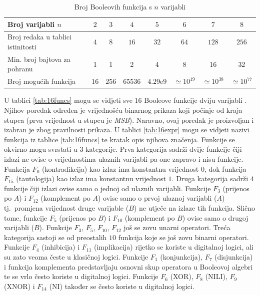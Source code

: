 \documentclass[times, utf8, diplomski]{fer}
\begin{document}
\begin{table}[htb]
	\centering
	\caption{Broj Booleovih funkcija s $n$ varijabli}
	\label{tab:broj-Funkcija}
	\begin{tabular}{|l|c|c|c|c|c|c|c|}
		\hline
		Broj varijabli $n$ & $2$ & $3$ & $4$ & $5$ & $6$ & $7$ & $8$ \\ \hline
		Broj redaka u tablici istinitosti & $4$ & $8$ & $16$ & $32$ & $64$ & $128$ & $256$ \\ \hline
		Min. broj bajtova za pohranu & 1 & 1 & 2 & 4 & 8 & 16 & 32 \\ \hline
		Broj mogućih funkcija & $16$ & $256$ & $65536$ & $4.29\mathrm{e}{9}$ & $\simeq 10^{19}$ & $\simeq 10^{38}$ & $\simeq 10^{77}$ \\ \hline
	\end{tabular}
\end{table}

U tablici \ref{tab:16funcs} mogu se vidjeti sve $16$ Booleove funkcije dviju varijabli \cite{book:digital_design}. Njihov poredak određen je vrijednošću binarnog prikaza koji počinje od kraja stupca (prva vrijednost u stupcu je \textit{MSB}). Naravno, ovaj poredak je proizvoljan i izabran je zbog pravilnosti prikaza. U tablici \ref{tab:16expr} mogu se vidjeti nazivi funkcija iz tablice \ref{tab:16funcs} te kratak opis njihova značenja. Funkcije se okvirno mogu svrstati u $3$ kategorije. Prva kategorija sadrži dvije funkcije čiji izlazi ne ovise o vrijednostima ulaznih varijabli pa one zapravo i nisu funkcije. Funkcija $F_{0}$ (kontradikcija) kao izlaz ima konstantnu vrijednost $0$, dok funkcija $F_{15}$ (tautologija) kao izlaz ima konstantnu vrijednost $1$. Druga kategorija sadrži $4$ funkcije čiji izlazi ovise samo o jednoj od ulaznih varijabli. Funkcije $F_{3}$ (prijenos po $A$) i $F_{12}$ (komplement po $A$) ovise samo o prvoj ulaznoj varijabli ($A$) tj.~promjena vrijednost druge varijable ($B$) ne utječe na izlaze tih funkcija. Slično tome, funkcije $F_{5}$ (prijenos po $B$) i $F_{10}$ (komplement po $B$) ovise samo o drugoj varijabli ($B$). Funkcije $F_{3}$, $F_{5}$, $F_{10}$, $F_{12}$ još se zovu unarni operatori. Treća kategorija sastoji se od preostalih $10$ funkcija koje se još zovu binarni operatori. Funkcije $F_{4}$ (inhibicija) i $F_{11}$ (implikacija) rijetko se koriste u digitalnoj logici, ali su zato veoma česte u klasičnoj logici. Funkcije $F_{1}$ (konjunkcija), $F_{7}$ (disjunkcija) i funkcija komplementa predstavljaju osnovni skup operatora u Booleovoj algebri te se vrlo često koriste u digitalnoj logici. Funkcije $F_{6}$ (XOR), $F_{8}$ (NILI), $F_{9}$ (XNOR) i $F_{14}$ (NI) također se često koriste u digitalnoj logici.
\end{document}
